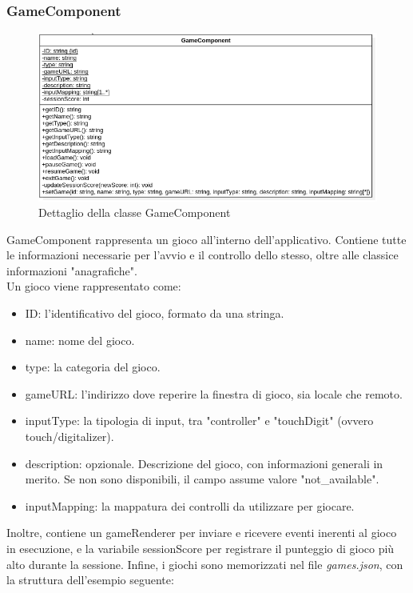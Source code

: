 \subsubsection{GameComponent}
\begin{figure}[h]
    \centering
    \includegraphics[width=340pt]{ProgettazioneTecnica/Game.png}
    \caption{Dettaglio della classe GameComponent}
    \label{fig:gameComponent}
\end{figure}
GameComponent rappresenta un gioco all'interno dell'applicativo. Contiene tutte le informazioni necessarie per l'avvio e il controllo dello stesso, oltre alle classice informazioni "anagrafiche".\\
Un gioco viene rappresentato come:
\begin{itemize}
    \item ID: l'identificativo del gioco, formato da una stringa.
    \item name: nome del gioco.
    \item type: la categoria del gioco.
    \item gameURL: l'indirizzo dove reperire la finestra di gioco, sia locale che remoto.
    \item inputType: la tipologia di input, tra "controller" e "touchDigit" (ovvero touch/digitalizer).
    \item description: opzionale. Descrizione del gioco, con informazioni generali in merito. Se non sono disponibili, il campo assume valore "not_available".
    \item inputMapping: la mappatura dei controlli da utilizzare per giocare.
\end{itemize}
Inoltre, contiene un gameRenderer per inviare e ricevere eventi inerenti al gioco in esecuzione, e la variabile sessionScore per registrare il punteggio di gioco più alto durante la sessione.
Infine, i giochi sono memorizzati nel file \emph{games.json}, con la struttura dell'esempio seguente:
